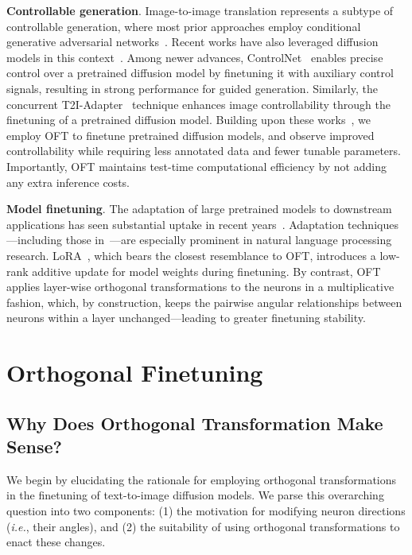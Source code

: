 \textbf{Controllable generation}. Image-to-image translation represents a subtype of controllable generation, where most prior approaches employ conditional generative adversarial networks~\cite{isola2017image,zhu2017toward,wang2018high,park2019semantic,choi2018stargan}. Recent works have also leveraged diffusion models in this context~\cite{saharia2022palette,voynov2022sketch,wang2022pretraining}. Among newer advances, ControlNet~\cite{zhang2023adding} enables precise control over a pretrained diffusion model by finetuning it with auxiliary control signals, resulting in strong performance for guided generation. Similarly, the concurrent T2I-Adapter~\cite{mou2023t2i} technique enhances image controllability through the finetuning of a pretrained diffusion model. Building upon these works~\cite{zhang2023adding,mou2023t2i}, we employ OFT to finetune pretrained diffusion models, and observe improved controllability while requiring less annotated data and fewer tunable parameters. Importantly, OFT maintains test-time computational efficiency by not adding any extra inference costs.

\textbf{Model finetuning}. The adaptation of large pretrained models to downstream applications has seen substantial uptake in recent years~\cite{devlin2018bert,brown2020language,he2022masked}. Adaptation techniques—including those in~\cite{hulora2022,houlsby2019parameter,pfeiffer2020adapterfusion}—are especially prominent in natural language processing research. LoRA~\cite{hulora2022}, which bears the closest resemblance to OFT, introduces a low-rank additive update for model weights during finetuning. By contrast, OFT applies layer-wise orthogonal transformations to the neurons in a multiplicative fashion, which, by construction, keeps the pairwise angular relationships between neurons within a layer unchanged—leading to greater finetuning stability.

\section{Orthogonal Finetuning}

\subsection{Why Does Orthogonal Transformation Make Sense?}

We begin by elucidating the rationale for employing orthogonal transformations in the finetuning of text-to-image diffusion models. We parse this overarching question into two components: (1) the motivation for modifying neuron directions (\emph{i.e.}, their angles), and (2) the suitability of using orthogonal transformations to enact these changes.

